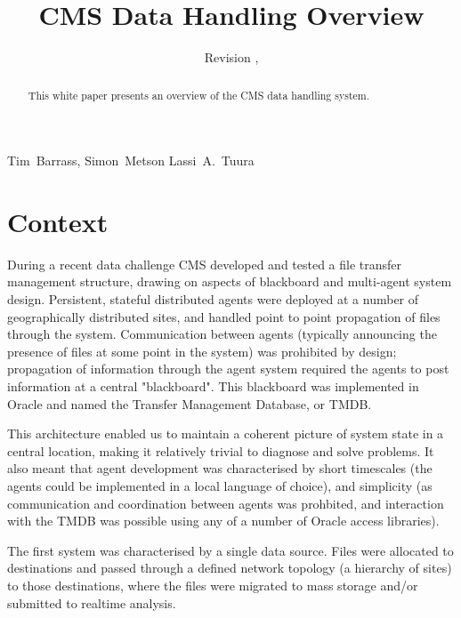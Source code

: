 \documentclass{cmspaper}
\begin{document}
\begin{titlepage}
  \whitepaper
  \date{Revision \RCSRevision, \RCSDate}
  \title{CMS Data Handling Overview}

  \begin{Authlist}
    Tim~Barrass, Simon~Metson
    Lassi~A.~Tuura
  \end{Authlist}

  \begin{abstract}
    This white paper presents an overview of the CMS data handling system.
  \end{abstract} 

\end{titlepage}

\setcounter{page}{2}

\section{Context}
During a recent data challenge CMS developed and tested a file transfer management structure, drawing on aspects of blackboard and multi-agent system design.  Persistent, stateful distributed agents were deployed at a number of geographically distributed sites, and handled point to point propagation of files through the system.  Communication between agents (typically announcing the presence of files at some point in the system) was prohibited by design; propagation of information through the agent system required the agents to post information at a central "blackboard".  This blackboard was implemented in Oracle and named the Transfer Management Database, or TMDB. 

This architecture enabled us to maintain a coherent picture of system state in a central location, making it relatively trivial to diagnose and solve problems.  It also meant that agent development was characterised by short timescales (the agents could be implemented in a local language of choice), and simplicity (as communication and coordination between agents was prohbited, and interaction with the TMDB was possible using any of a number of Oracle access libraries).

The first system was characterised by a single data source.  Files were allocated to destinations and passed through a defined network topology (a hierarchy of sites) to those destinations, where the files were migrated to mass storage and/or submitted to realtime analysis.
\end{document}
